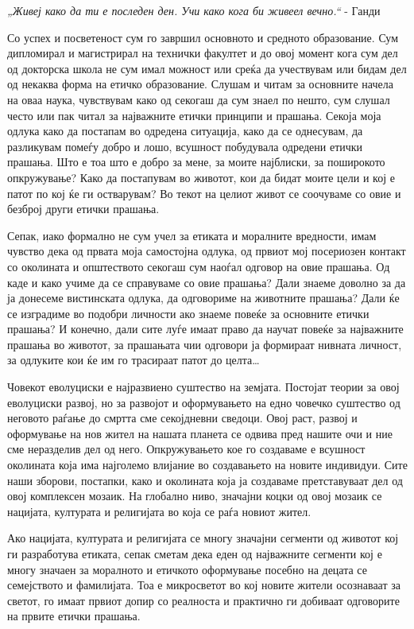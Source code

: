 \documentclass[12pt,a4paper]{article}
\begin{document}
\thispagestyle{empty}

\vfill
\emph{„Живеј како да ти е последен ден. Учи како кога би живеел вечно.“} - Ганди
\vfill

Со успех и посветеност сум го завршил основното и средното
образование. Сум дипломирал и магистрирал на технички факултет и до овој
момент кога сум дел од докторска школа не сум имал можност или
среќа да учествувам или бидам дел од некаква форма на етичко образование.
Слушам и читам за основните начела на оваа наука, чувствувам како од секогаш
да сум знаел по нешто, сум слушал често или пак читал за најважните етички принципи и
прашања. Секоја моја одлука како да постапам во одредена ситуација, како да се
однесувам, да разликувам помеѓу добро и лошо, всушност побудувала
одредени етички прашања. Што е тоа што е добро за мене, за моите најблиски, за
поширокото опкружување? Како да постапувам во животот, кои да бидат моите цели и
кој е патот по кој ќе ги остварувам? Во текот на целиот живот се соочуваме
со овие и безброј други етички прашања.

Сепак, иако формално не сум учел за етиката и моралните вредности, имам чувство
дека од првата моја самостојна одлука, од првиот мој посериозен контакт со
околината и општеството секогаш сум наоѓал одговор на овие прашања. Од
каде и како учиме да се справуваме со овие прашања? Дали знаеме доволно за
да ја донесеме вистинската одлука, да одговориме на животните прашања? 
Дали ќе се изградиме во подобри личности ако знаеме повеќе за основните етички
прашања? И конечно, дали сите луѓе имаат право да научат повеќе за најважните
прашања во животот, за прашањата чии одговори ја формираат нивната личност, за одлуките кои
ќе им го трасираат патот до целта\ldots

Човекот еволуциски е најразвиено суштество на земјата. Постојат теории за овој 
еволуциски развој, но за развојот и оформувањето на едно човечко суштество од
неговото раѓање до смртта сме секојдневни сведоци. Овој раст, развој и
оформување на нов жител на нашата планета се одвива пред нашите очи и ние сме
неразделив дел од него. Опкружувањето кое го создаваме е всушност околината која
има најголемо влијание во создавањето на новите индивидуи. Сите наши зборови,
постапки, како и околината која ја создаваме претставуваат дел од овој
комплексен мозаик. На глобално ниво, значајни коцки од овој мозаик се
нацијата, културата и религијата во која се раѓа новиот жител. 

Ако нацијата, културата и религијата се многу значајни сегменти од животот
кој ги разработува етиката, сепак сметам дека еден од најважните сегменти кој е
многу значаен за моралното и етичкото оформување посебно на децата се семејството и фамилијата. Тоа е
микросветот во кој новите жители осознаваат за светот, го имаат првиот допир со
реалноста и практично ги добиваат одговорите на првите етички прашања.
\end{document}
